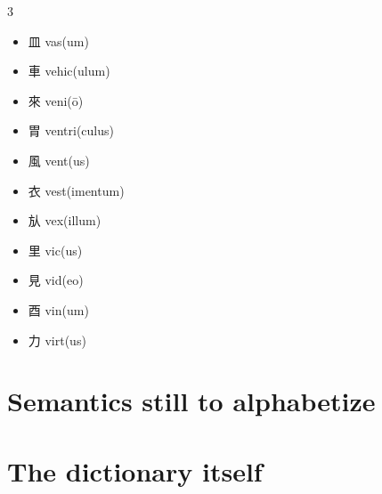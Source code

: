\documentclass[xetex, svgnames, 12pt]{scrartcl}
\begin{document}
\begin{multicols}{3}
\begin{itemize}[noitemsep]
    \item 皿 vas(um) 
    \item 車 vehic(ulum) 
    \item 來 veni(ō)
    \item 胃 ventri(culus)
    \item 風 vent(us)
    \item 衣 vest(imentum) 
    \item 㫃 vex(illum) 
    \item 里 vic(us) 
    \item 見 vid(eo) 
    \item 酉 vin(um)
    \item 力 virt(us)
\end{itemize}
\end{multicols}

\section{Semantics still to alphabetize}



\section{The dictionary itself}
\end{document}
